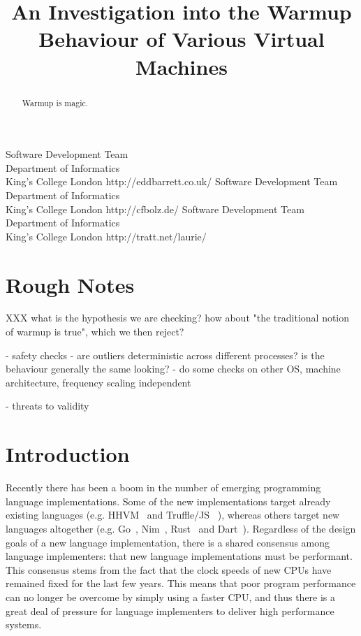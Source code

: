 \documentclass[10pt,preprint]{sigplanconf}
\begin{document}
\title{An Investigation into the Warmup Behaviour of Various Virtual Machines}
           {Software Development Team\\ Department of Informatics\\ King's College London}
           {http://eddbarrett.co.uk/}
           {Software Development Team\\ Department of Informatics\\ King's College London}
           {http://cfbolz.de/}
           {Software Development Team\\ Department of Informatics\\ King's College London}
           {http://tratt.net/laurie/}

\maketitle


\begin{abstract}
Warmup is magic.
\end{abstract}

\section*{Rough Notes}

XXX what is the hypothesis we are checking? how about "the traditional notion
of warmup is true", which we then reject?


- safety checks
  - are outliers deterministic across different processes? is the behaviour
    generally the same looking?
  - do some checks on other OS, machine architecture, frequency scaling independent

- threats to validity

\section{Introduction}
\label{sec:intro}

Recently there has been a boom in the number of emerging programming language
implementations. Some of the new implementations target already existing
languages (e.g. HHVM~\cite{XXX} and Truffle/JS ~\cite{XXX}), whereas others
target new languages altogether (e.g. Go~\cite{XXX}, Nim~\cite{XXX},
Rust~\cite{XXX} and Dart~\cite{XXX}). Regardless of the design goals of a new
language implementation, there is a shared consensus among language
implementers: that new language implementations must be performant.  This
consensus stems from the fact that the clock speeds of new CPUs have remained
fixed for the last few years. This means that poor program performance can no
longer be overcome by simply using a faster CPU, and thus there is a great deal
of pressure for language implementers to deliver high performance systems.
\end{document}
